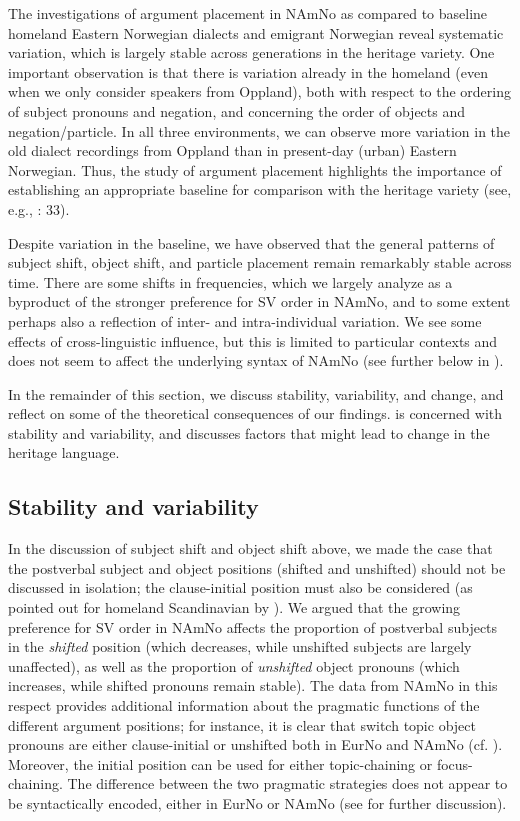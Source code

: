 \documentclass[output=paper]{langscibook}
\begin{document}
The investigations of argument placement in NAmNo as compared to baseline homeland Eastern Norwegian dialects and emigrant Norwegian reveal systematic variation, which is largely stable across generations in the heritage variety. One important observation is that there is variation already in the homeland (even when we only consider speakers from Oppland), both with respect to the ordering of subject pronouns and negation, and concerning the order of objects and negation/particle. In all three environments, we can observe more variation in the old dialect recordings from Oppland than in present-day (urban) Eastern Norwegian. Thus, the study of argument placement highlights the importance of establishing an appropriate baseline for comparison with the heritage variety (see, e.g., \citealt{Polinsky2018}: 33). 

Despite variation in the baseline, we have observed that the general patterns of subject shift, object shift, and particle placement remain remarkably stable across time. There are some shifts in frequencies, which we largely analyze as a byproduct of the stronger preference for SV order in NAmNo, and to some extent perhaps also a reflection of inter- and intra-individual variation. We see some effects of cross-linguistic influence, but this is limited to particular contexts and does not seem to affect the underlying syntax of NAmNo (see further below in ). 

In the remainder of this section, we discuss stability, variability, and change, and reflect on some of the theoretical consequences of our findings.  is concerned with stability and variability, and  discusses factors that might lead to change in the heritage language. 

\subsection{Stability and variability}\label{sec:larsson:6.1}

In the discussion of subject shift and object shift above, we made the case that the postverbal subject and object positions (shifted and unshifted) should not be discussed in isolation; the clause-initial position must also be considered (as pointed out for homeland Scandinavian by \citealt{Andréasson2010}). We argued that the growing preference for SV order in NAmNo affects the proportion of postverbal subjects in the \textit{shifted} position (which decreases, while unshifted subjects are largely unaffected), as well as the proportion of \textit{unshifted} object pronouns (which increases, while shifted pronouns remain stable). The data from NAmNo in this respect provides additional information about the pragmatic functions of the different argument positions; for instance, it is clear that switch topic object pronouns are either clause-initial or unshifted both in EurNo and NAmNo (cf. \citealt{BentzenAnderssen2019}). Moreover, the initial position can be used for either topic-chaining or focus-chaining. The difference between the two pragmatic strategies does not appear to be syntactically encoded, either in EurNo or NAmNo (see \citealt{LindahlEngdahl2022} for further discussion). 
\end{document}
